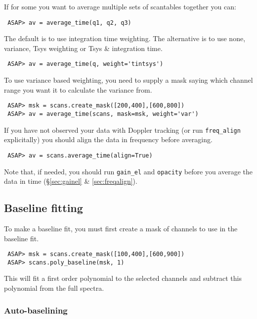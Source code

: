 \documentclass[11pt]{article}
\newcommand{\cmd}[1]{{\tt #1}}
\begin{document}
If for some you want to average multiple sets of scantables together
you can:

\begin{verbatim}
 ASAP> av = average_time(q1, q2, q3)
\end{verbatim}

The default is to use integration time weighting. The alternative is
to use none, variance, Tsys weighting or Tsys \& integration time.

\begin{verbatim}
 ASAP> av = average_time(q, weight='tintsys')
\end{verbatim}

To use variance based weighting, you need to supply a mask saying which
channel range you want it to calculate the variance from.

\begin{verbatim}
 ASAP> msk = scans.create_mask([200,400],[600,800])
 ASAP> av = average_time(scans, mask=msk, weight='var')
\end{verbatim}

If you have not observed your data with Doppler tracking (or run
\cmd{freq\_align} explicitally) you should align the data in frequency
before averaging.

\begin{verbatim}
 ASAP> av = scans.average_time(align=True)
\end{verbatim}

Note that, if needed, you should run \cmd{gain\_el} and \cmd{opacity}
before you average the data in time (\S \ref{sec:gainel} \&
\ref{sec:freqalign}).

\subsection{Baseline fitting}

To make a baseline fit, you must first create
a mask of channels to use in the baseline fit.

\begin{verbatim}
 ASAP> msk = scans.create_mask([100,400],[600,900])
 ASAP> scans.poly_baseline(msk, 1)
\end{verbatim}

This will fit a first order polynomial to the selected channels and subtract
this polynomial from the full spectra.

\subsubsection{Auto-baselining}
\end{document}
